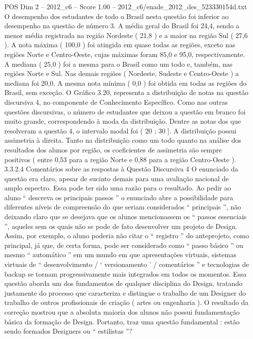 \begin{textsample}{POS Dim 2 – 2012\_c6 – Score 1.00 – 2012\_c6/enade\_2012\_des\_523330154d.txt}
O desempenho dos estudantes de todo o Brasil nesta questão foi inferior ao desempenho na questão de número 3.
A média geral do Brasil foi 24,4, sendo a menor média registrada na região Nordeste ( 21,8 ) e a maior na região Sul ( 27,6 ).
A nota máxima ( 100,0 ) foi atingida em quase todas as regiões, exceto nas regiões Norte e Centro-Oeste, cujas máximas foram 85,0 e 95,0, respectivamente.
A mediana ( 25,0 ) foi a mesma para o Brasil como um todo e, também, nas regiões Norte e Sul.
Nas demais regiões ( Nordeste, Sudeste e Centro-Oeste ) a mediana foi 20,0.
A mesma nota mínima ( 0,0 ) foi obtida em todas as regiões do Brasil, sem exceção.
O Gráfico 3.20, representa a distribuição de notas na questão discursiva 4, no componente de Conhecimento Específico.
Como nas outras questões discursivas, o número de estudantes que deixou a questão em branco foi muito grande, correspondendo à moda da distribuição.
Dentre as notas dos que resolveram a questão 4, o intervalo modal foi ( 20 ; 30 ].
A distribuição possui assimetria à direita.
Tanto na distribuição como um todo quanto na análise dos resultados dos alunos por região, os coeficientes de assimetria são sempre positivos ( entre 0,53 para a região Norte e 0,88 para a região Centro-Oeste ). 3.3.2.4 Comentários sobre as respostas à Questão Discursiva 4 O enunciado da questão era claro, apesar de sucinto demais para uma avaliação nacional de amplo espectro.
Essa pode ter sido uma razão para o resultado.
Ao pedir ao aluno “ descreva os principais passos ” o enunciado abre a possibilidade para diferentes níveis de compreensão do que seriam considerados “ principais ”, não deixando claro que se desejava que os alunos mencionassem os “ passos essenciais ”, aqueles sem os quais não se pode de fato desenvolver um projeto de Design.
Assim, por exemplo, o aluno poderia não citar o “ registro ” do anteprojeto, como principal, já que, de certa forma, pode ser considerado como “ passo básico ” ou mesmo “ automático ” em um mundo em que apresentações virtuais, sistemas virtuais de “ desenvolvimento / ‘ versionamento ’ / comentários ” e tecnologias de backup se tornam progressivamente mais integrados em todos os momentos.
Essa questão aborda um dos fundamentos de qualquer disciplina do Design, tratando justamente do processo que caracteriza e distingue o trabalho de um Designer do trabalho de outros profissionais de criação ( artes ou engenharia ).
O resultado da correção mostrou que a absoluta maioria dos alunos não possui fundamentação básica da formação de Design.
Portanto, traz uma questão fundamental : estão sendo formados Designers ou “ estilistas ”?

\end{textsample}
